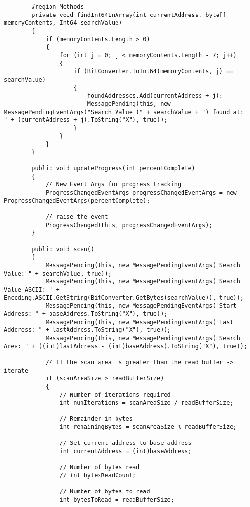 \begin{lstlisting}
        #region Methods
        private void findInt64InArray(int currentAddress, byte[] memoryContents, Int64 searchValue)
        {
            if (memoryContents.Length > 0)
            {
                for (int j = 0; j < memoryContents.Length - 7; j++)
                {
                    if (BitConverter.ToInt64(memoryContents, j) == searchValue)
                    {
                        foundAddresses.Add(currentAddress + j);
                        MessagePending(this, new MessagePendingEventArgs("Search Value (" + searchValue + ") found at: " + (currentAddress + j).ToString("X"), true));
                    }
                }
            }
        }

        public void updateProgress(int percentComplete)
        {
            // New Event Args for progress tracking
            ProgressChangedEventArgs progressChangedEventArgs = new ProgressChangedEventArgs(percentComplete);            

            // raise the event
            ProgressChanged(this, progressChangedEventArgs);
        }

        public void scan()
        {
            MessagePending(this, new MessagePendingEventArgs("Search Value: " + searchValue, true));
            MessagePending(this, new MessagePendingEventArgs("Search Value ASCII: " + Encoding.ASCII.GetString(BitConverter.GetBytes(searchValue)), true));
            MessagePending(this, new MessagePendingEventArgs("Start Address: " + baseAddress.ToString("X"), true));
            MessagePending(this, new MessagePendingEventArgs("Last Adddress: " + lastAddress.ToString("X"), true));
            MessagePending(this, new MessagePendingEventArgs("Search Area: " + ((int)lastAddress - (int)baseAddress).ToString("X"), true));

            // If the scan area is greater than the read buffer -> iterate
            if (scanAreaSize > readBufferSize)
            {
                // Number of iterations required
                int numIterations = scanAreaSize / readBufferSize;
                
                // Remainder in bytes
                int remainingBytes = scanAreaSize % readBufferSize;

                // Set current address to base address
                int currentAddress = (int)baseAddress;

                // Number of bytes read
                // int bytesReadCount;

                // Number of bytes to read
                int bytesToRead = readBufferSize;


\end{lstlisting}
